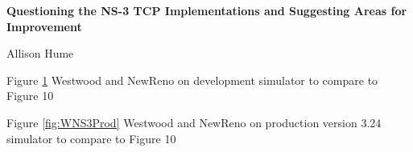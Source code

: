

\begin{center}

\large{\textbf{Questioning the NS-3 TCP Implementations and Suggesting Areas for Improvement}}

\vskip 5pt

Allison Hume

\end{center}

\vskip 5pt 


\vskip 5pt  

\vskip 5pt  

Figure \ref{fig:WNS3} Westwood and NewReno on development simulator to compare to \cite{NS3W} Figure 10

\begin{figure}[h!]
\begin{center}
\end{center}
\caption{}
\label{fig:WNS3}
\end{figure}

Figure \ref{fig:WNS3Prod} Westwood and NewReno on production version 3.24 simulator to compare to \cite{NS3W} Figure 10

